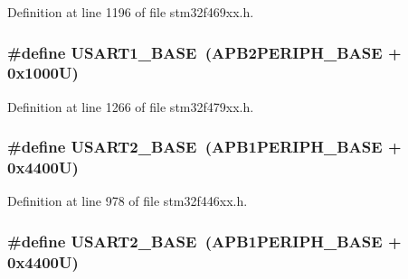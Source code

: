 Definition at line 1196 of file stm32f469xx.\+h.

\subsubsection[{\texorpdfstring{U\+S\+A\+R\+T1\+\_\+\+B\+A\+SE}{USART1_BASE}}]{\setlength{\rightskip}{0pt plus 5cm}\#define U\+S\+A\+R\+T1\+\_\+\+B\+A\+SE~({\bf A\+P\+B2\+P\+E\+R\+I\+P\+H\+\_\+\+B\+A\+SE} + 0x1000\+U)}\hypertarget{group___peripheral__memory__map_ga86162ab3f740db9026c1320d46938b4d}{}\label{group___peripheral__memory__map_ga86162ab3f740db9026c1320d46938b4d}


Definition at line 1266 of file stm32f479xx.\+h.

\subsubsection[{\texorpdfstring{U\+S\+A\+R\+T2\+\_\+\+B\+A\+SE}{USART2_BASE}}]{\setlength{\rightskip}{0pt plus 5cm}\#define U\+S\+A\+R\+T2\+\_\+\+B\+A\+SE~({\bf A\+P\+B1\+P\+E\+R\+I\+P\+H\+\_\+\+B\+A\+SE} + 0x4400\+U)}\hypertarget{group___peripheral__memory__map_gade83162a04bca0b15b39018a8e8ec090}{}\label{group___peripheral__memory__map_gade83162a04bca0b15b39018a8e8ec090}


Definition at line 978 of file stm32f446xx.\+h.

\subsubsection[{\texorpdfstring{U\+S\+A\+R\+T2\+\_\+\+B\+A\+SE}{USART2_BASE}}]{\setlength{\rightskip}{0pt plus 5cm}\#define U\+S\+A\+R\+T2\+\_\+\+B\+A\+SE~({\bf A\+P\+B1\+P\+E\+R\+I\+P\+H\+\_\+\+B\+A\+SE} + 0x4400\+U)}\hypertarget{group___peripheral__memory__map_gade83162a04bca0b15b39018a8e8ec090}{}\label{group___peripheral__memory__map_gade83162a04bca0b15b39018a8e8ec090}


